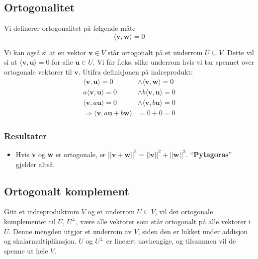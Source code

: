 \documentclass[12pt,a4paper,norsk]{article}
\newcommand{\inner}[1]{\langle#1\rangle}
\newcommand{\vv}{\textbf{v}}
\newcommand{\vw}{\textbf{w}}
\newcommand{\vu}{\textbf{u}}
\begin{document}
\subsection{Ortogonalitet}
Vi definerer ortogonalitet på følgende måte
\[\inner{\vv,\vw} = 0\]

Vi kan også si at en vektor $\vv \in V$ står ortogonalt på et underrom
$U \subseteq V$. Dette vil si at $\inner{\vv,\vu} = 0$ for alle $\vu \in U$. Vi får f.eks.\@
slike underrom hvis vi tar spennet over ortogonale vektorer til $\vv$. Utifra
definisjonen på indreprodukt:
\begin{align*}
  \inner{\vv,\vu} = 0 &\land \inner{\vv,\vw} = 0 \\
  a \inner{\vv,\vu} = 0 &\land b \inner{\vv,\vu} = 0 \\
  \inner{\vv,a \vu} = 0 &\land \inner{\vv,b \vu} = 0 \\
  \Longrightarrow \inner{\vv, a\vu + b\vw} &= 0+0 = 0
\end{align*}

\subsubsection{Resultater}
\begin{itemize}
  \item Hvis \vv{} og \vw{} er ortogonale, er
    $||\vv + \vw||^{2} = ||\vv||^{2} + ||\vw||^{2}$. ``\textbf{Pytagoras}'' gjelder altså.
\end{itemize}

\subsection{Ortogonalt komplement}\label{sec:ortogonalt_komplement}
Gitt et indreproduktrom $V$ og et underrom $U \subseteq V$, vil det ortogonale
komplementet til $U$, $U^{\bot}$, være alle vektorer som står ortogonalt på
alle vektorer i $U$. Denne mengden utgjør et underrom av $V$, siden den er
lukket under addisjon og skalarmultiplikasjon. $U$ og $U^{\bot}$ er lineært
uavhengige, og tilsammen vil de spenne ut hele $V$.
\end{document}
